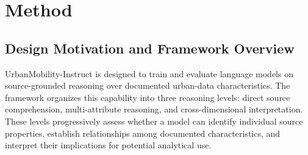 \documentclass[a4paper,fleqn]{cas-sc}
\begin{document}










\section{Method}\label{sec4}
\subsection{Design Motivation and Framework Overview}

UrbanMobility-Instruct is designed to train and evaluate language models on source-grounded reasoning over documented urban-data characteristics. The framework organizes this capability into three reasoning levels: direct source comprehension, multi-attribute reasoning, and cross-dimensional interpretation. These levels progressively assess whether a model can identify individual source properties, establish relationships among documented characteristics, and interpret their implications for potential analytical use.
\end{document}
